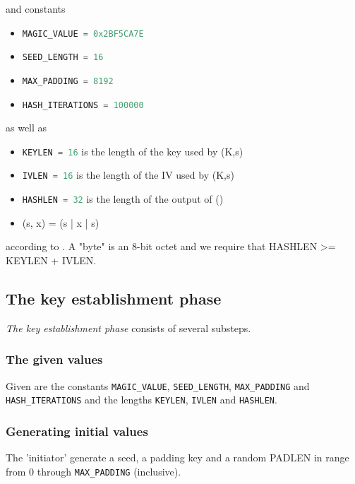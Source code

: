 \documentclass[sigconf, screen]{acmart}
\begin{document}
and constants
\begin{itemize}
    \item \lstinline[language=C]{MAGIC_VALUE = 0x2BF5CA7E}
    \item \lstinline[language=C]{SEED_LENGTH = 16}
    \item \lstinline[language=C]{MAX_PADDING = 8192}
    \item \lstinline[language=C]{HASH_ITERATIONS = 100000}
\end{itemize}

as well as
\begin{itemize}
    \item \lstinline[language=C]{KEYLEN = 16} is the length of the key used by \enc(K,s)
    \item \lstinline[language=C]{IVLEN = 16} is the length of the IV used by \enc(K,s)
    \item \lstinline[language=C]{HASHLEN = 32} is the length of the output of \hash()
    \item \mac(s, x) = \hash(s | x | s)
\end{itemize}

according to \cite{TorGitWebObfs2Specification}. A "byte" is an 8-bit octet and we require that HASHLEN >= KEYLEN + IVLEN.
\subsection{The key establishment phase}
\label{ss:theKeyestablishmentphase}
\textit{The key establishment phase} consists of several substeps.
\subsubsection{The given values}
\label{sss:thegivenvalues}
Given are the constants \lstinline[language=C]{MAGIC_VALUE}, \lstinline[language=C]{SEED_LENGTH}, \lstinline[language=C]{MAX_PADDING} and \lstinline[language=C]{HASH_ITERATIONS} and the lengths \lstinline[language=C]{KEYLEN}, \lstinline[language=C]{IVLEN} and \lstinline[language=C]{HASHLEN}.
\subsubsection{Generating initial values}
\label{sss:generatinginitialvalues}
The 'initiator' generate a seed, a padding key and a random PADLEN in range from 0 through \lstinline[language=C]{MAX_PADDING} (inclusive).
\end{document}
